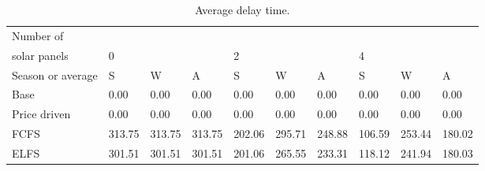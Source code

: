 \begin{table}[h]
\centering
\begin{tabular}{l|lll|lll|lll}Number of \\ solar panels&0& & &2& & &4& & \\ \hline
Season or average & S & W & A & S & W & A & S & W & A \\ \hline
Base&0.00&0.00&0.00&0.00&0.00&0.00&0.00&0.00&0.00 \\
Price driven&0.00&0.00&0.00&0.00&0.00&0.00&0.00&0.00&0.00 \\
FCFS&313.75&313.75&313.75&202.06&295.71&248.88&106.59&253.44&180.02 \\
ELFS&301.51&301.51&301.51&201.06&265.55&233.31&118.12&241.94&180.03 \\
\end{tabular}
\caption{Average delay time.}
\label{avg delay}
\end{table}
